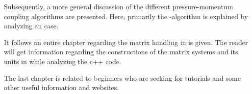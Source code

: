     Subsequently, a more general discussion of the different pressure-momentum
    coupling algorithms are presented. Here, primarily the \PIMPLE-algorithm is
    explained by analyzing an \OF case.


    It follows an entire chapter regarding the matrix handling in \OF is
    given. The reader will get information regarding the constructions of
    the matrix systems and its units in \OF while analyzing the c++ code.


    The last chapter is related to \OF beginners who are seeking for tutorials
    and some other useful information and websites.
%
%
